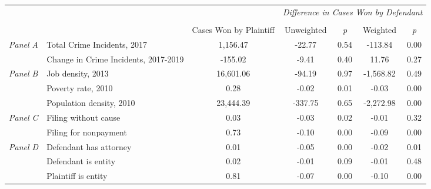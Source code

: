 \begin{tabular}{llccccc}
\toprule
 &  & \textit{} & \multicolumn{4}{c}{\textit{Difference in Cases Won by Defendant}} \\
\cline{4-7}
\\
 &  & Cases Won by Plaintiff & Unweighted & \emph{p} & Weighted & \emph{p} \\
\midrule
\multirow[c]{2}{.75cm}{\textit{Panel A}} & Total Crime Incidents, 2017 & 1,156.47 & -22.77 & 0.54 & -113.84 & 0.00 \\
 & Change in Crime Incidents, 2017-2019 & -155.02 & -9.41 & 0.40 & 11.76 & 0.27 \\
\cline{1-7}
\multirow[c]{3}{.75cm}{\textit{Panel B}} & Job density, 2013 & 16,601.06 & -94.19 & 0.97 & -1,568.82 & 0.49 \\
 & Poverty rate, 2010 & 0.28 & -0.02 & 0.01 & -0.03 & 0.00 \\
 & Population density, 2010 & 23,444.39 & -337.75 & 0.65 & -2,272.98 & 0.00 \\
\cline{1-7}
\multirow[c]{2}{.75cm}{\textit{Panel C}} & Filing without cause & 0.03 & -0.03 & 0.02 & -0.01 & 0.32 \\
 & Filing for nonpayment & 0.73 & -0.10 & 0.00 & -0.09 & 0.00 \\
\cline{1-7}
\multirow[c]{3}{.75cm}{\textit{Panel D}} & Defendant has attorney & 0.01 & -0.05 & 0.00 & -0.02 & 0.01 \\
 & Defendant is entity & 0.02 & -0.01 & 0.09 & -0.01 & 0.48 \\
 & Plaintiff is entity & 0.81 & -0.07 & 0.00 & -0.10 & 0.00 \\
\cline{1-7}
\bottomrule
\end{tabular}
